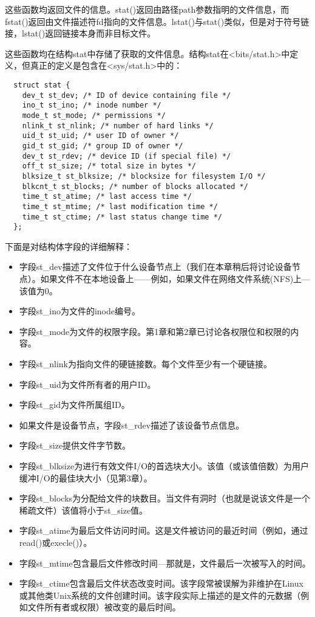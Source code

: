 这些函数均返回文件的信息。stat()返回由路径path参数指明的文件信息，而fstat()返回由文件描述符fd指向的文件信息。lstat()与stat()类似，但是对于符号链接，lstat()返回链接本身而非目标文件。

这些函数均在结构stat中存储了获取的文件信息。结构stat在<bits/stat.h>中定义，但真正的定义是包含在<sys/stat.h>中的：

\begin{lstlisting}
  struct stat {
    dev_t st_dev; /* ID of device containing file */
    ino_t st_ino; /* inode number */
    mode_t st_mode; /* permissions */
    nlink_t st_nlink; /* number of hard links */
    uid_t st_uid; /* user ID of owner */
    gid_t st_gid; /* group ID of owner */
    dev_t st_rdev; /* device ID (if special file) */
    off_t st_size; /* total size in bytes */
    blksize_t st_blksize; /* blocksize for filesystem I/O */
    blkcnt_t st_blocks; /* number of blocks allocated */
    time_t st_atime; /* last access time */
    time_t st_mtime; /* last modification time */
    time_t st_ctime; /* last status change time */
  };
\end{lstlisting}

下面是对结构体字段的详细解释：

\begin{itemize}
\item 字段st\_dev描述了文件位于什么设备节点上（我们在本章稍后将讨论设备节点）。如果文件不在本地设备上——例如，如果文件在网络文件系统(NFS)上—该值为0。
\item 字段st\_ino为文件的inode编号。
\item 字段st\_mode为文件的权限字段。第1章和第2章已讨论各权限位和权限的内容。
\item 字段st\_nlink为指向文件的硬链接数。每个文件至少有一个硬链接。
\item 字段st\_uid为文件所有者的用户ID。
\item 字段st\_gid为文件所属组ID。
\item 如果文件是设备节点，字段st\_rdev描述了该设备节点信息。
\item 字段st\_size提供文件字节数。
\item 字段st\_blksize为进行有效文件I/O的首选块大小。该值（或该值倍数）为用户缓冲I/O的最佳块大小（见第3章）。
\item 字段st\_blocks为分配给文件的块数目。当文件有洞时（也就是说该文件是一个稀疏文件）该值将小于st\_size值。
\item 字段st\_atime为最后文件访问时间。这是文件被访问的最近时间（例如，通过read()或execle()）。
\item 字段st\_mtime包含最后文件修改时间—那就是，文件最后一次被写入的时间。
\item 字段st\_ctime包含最后文件状态改变时间。该字段常被误解为非维护在Linux或其他类Unix系统的文件创建时间。该字段实际上描述的是文件的元数据（例如文件所有者或权限）被改变的最后时间。
\end{itemize}

